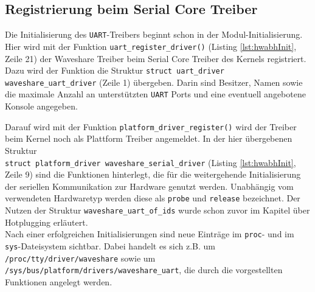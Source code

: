\subsection{Registrierung beim Serial Core Treiber} %
Die Initialisierung des \texttt{UART}-Treibers beginnt schon in der Modul-Initialisierung. 
Hier wird mit der Funktion \texttt{uart_register_driver()} (Listing \ref{lst:hwabhInit}, Zeile 21) der Waveshare Treiber beim Serial Core Treiber des Kernels registriert. Dazu wird der Funktion die Struktur \texttt{struct uart_driver waveshare_uart_driver} (Zeile 1) übergeben. Darin sind Besitzer, Namen sowie die maximale Anzahl an unterstützten \texttt{UART} Ports und eine eventuell angebotene Konsole angegeben. 

Darauf wird mit der Funktion \texttt{platform_driver_register()} wird der Treiber beim Kernel noch als Plattform Treiber angemeldet. In der hier übergebenen Struktur \\ 
\texttt{struct platform_driver waveshare_serial_driver} (Listing \ref{lst:hwabhInit}, Zeile 9) sind die Funktionen hinterlegt, die für die weitergehende Initialisierung der seriellen Kommunikation zur Hardware genutzt werden. 
Unabhängig vom verwendeten Hardwaretyp werden diese als \texttt{probe} und \texttt{release} bezeichnet. Der Nutzen der Struktur \texttt{waveshare\_uart\_of\_ids} wurde schon zuvor im Kapitel über Hotplugging erläutert. \\

Nach einer erfolgreichen Initialisierungen sind neue Einträge im \texttt{proc}- und im \texttt{sys}-Dateisystem sichtbar. Dabei handelt es sich z.B. um \texttt{/proc/tty/driver/waveshare} sowie um \texttt{/sys/bus/platform/drivers/waveshare\_uart}, die durch die vorgestellten Funktionen angelegt werden. 



